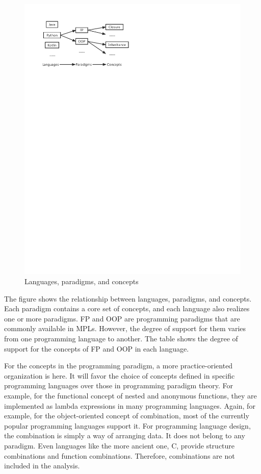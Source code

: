 \begin{figure}[htbp]
    \centerline{\includegraphics[scale=0.8]{figures/concept}}
    \caption{Languages, paradigms, and concepts}
    \label{fig:concept}
\end{figure}

The figure shows the relationship between languages, paradigms, and concepts. Each paradigm contains a core set of concepts, and each language also realizes one or more paradigms. FP and OOP are programming paradigms that are commonly available in MPLs. However, the degree of support for them varies from one programming language to another. The table shows the degree of support for the concepts of FP and OOP in each language.

For the concepts in the programming paradigm, a more practice-oriented organization is here. It will favor the choice of concepts defined in specific programming languages over those in programming paradigm theory. For example, for the functional concept of nested and anonymous functions, they are implemented as lambda expressions in many programming languages. Again, for example, for the object-oriented concept of combination, most of the currently popular programming languages support it. For programming language design, the combination is simply a way of arranging data. It does not belong to any paradigm. Even languages like the more ancient one, C, provide structure combinations and function combinations. Therefore, combinations are not included in the analysis.

